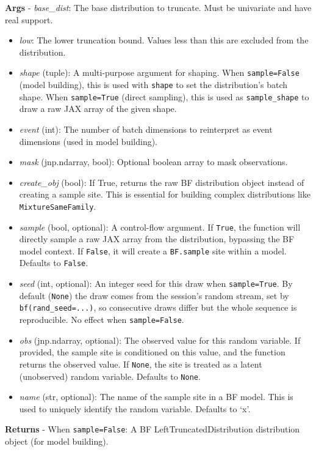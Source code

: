 \documentclass[
  letterpaper,
  DIV=11,
  numbers=noendperiod]{scrartcl}
\begin{document}
\textbf{Args} - \emph{base\_dist}: The base distribution to truncate.
Must be univariate and have real support.

\begin{itemize}
\item
  \emph{low}: The lower truncation bound. Values less than this are
  excluded from the distribution.
\item
  \emph{shape} (tuple): A multi-purpose argument for shaping. When
  \texttt{sample=False} (model building), this is used with
  \texttt{shape} to set the distribution's batch shape. When
  \texttt{sample=True} (direct sampling), this is used as
  \texttt{sample\_shape} to draw a raw JAX array of the given shape.
\item
  \emph{event} (int): The number of batch dimensions to reinterpret as
  event dimensions (used in model building).
\item
  \emph{mask} (jnp.ndarray, bool): Optional boolean array to mask
  observations.
\item
  \emph{create\_obj} (bool): If True, returns the raw BF distribution
  object instead of creating a sample site. This is essential for
  building complex distributions like \texttt{MixtureSameFamily}.
\item
  \emph{sample} (bool, optional): A control-flow argument. If
  \texttt{True}, the function will directly sample a raw JAX array from
  the distribution, bypassing the BF model context. If \texttt{False},
  it will create a \texttt{BF.sample} site within a model. Defaults to
  \texttt{False}.
\item
  \emph{seed} (int, optional): An integer seed for this draw when
  \texttt{sample=True}. By default (\texttt{None}) the draw comes from
  the session's random stream, set by \texttt{bf(rand\_seed=...)}, so
  consecutive draws differ but the whole sequence is reproducible. No
  effect when \texttt{sample=False}.
\item
  \emph{obs} (jnp.ndarray, optional): The observed value for this random
  variable. If provided, the sample site is conditioned on this value,
  and the function returns the observed value. If \texttt{None}, the
  site is treated as a latent (unobserved) random variable. Defaults to
  \texttt{None}.
\item
  \emph{name} (str, optional): The name of the sample site in a BF
  model. This is used to uniquely identify the random variable. Defaults
  to `x'.
\end{itemize}

\textbf{Returns} - When \texttt{sample=False}: A BF
LeftTruncatedDistribution distribution object (for model building).
\end{document}
